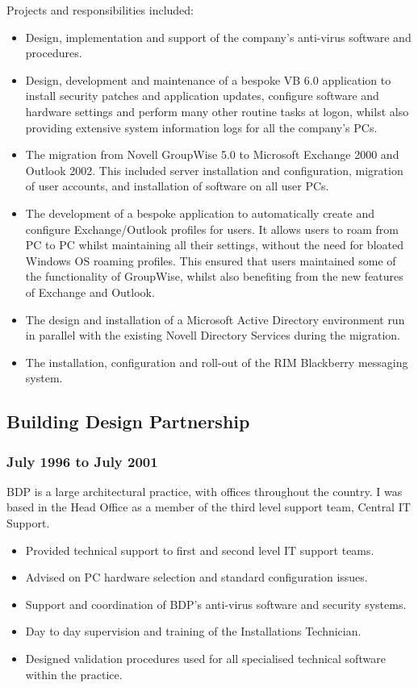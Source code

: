 \documentclass[10pt]{article}
\begin{document}
Projects and responsibilities included:

\begin{itemize}
    \item Design, implementation and support of the company's anti-virus software and 
          procedures.
    \item Design, development and maintenance of a bespoke VB 6.0 application to
          install security patches and application updates, configure software and
          hardware settings and perform many other routine tasks at logon, whilst also
          providing extensive system information logs for all the company's PCs.
    \item The migration from Novell GroupWise 5.0 to Microsoft Exchange 2000 and
          Outlook 2002.  This included server installation and configuration, migration
          of user accounts, and installation of software on all user PCs.
    \item The development of a bespoke application to automatically create and
          configure Exchange/Outlook profiles for users.  It allows users to roam from
          PC to PC whilst maintaining all their settings, without the need for bloated
          Windows OS roaming profiles.  This ensured that users maintained some of the
          functionality of GroupWise, whilst also benefiting from the new features of
          Exchange and Outlook.
    \item The design and installation of a Microsoft Active Directory environment run
          in parallel with the existing Novell Directory Services during the migration.
    \item The installation, configuration and roll-out of the RIM Blackberry messaging
          system.
\end{itemize}

\subsection{Building Design Partnership}
\subsubsection{July 1996 to July 2001}

BDP is a large architectural practice, with offices throughout the country.  I
was based in the Head Office as a member of the third level support team,
Central IT Support.

\begin{itemize}
    \item Provided technical support to first and second level IT support teams.
    \item Advised on PC hardware selection and standard configuration issues.
    \item Support and coordination of BDP's anti-virus software and security systems.
    \item Day to day supervision and training of the Installations Technician.
    \item Designed validation procedures used for all specialised technical software
          within the practice.
\end{itemize}
\end{document}
